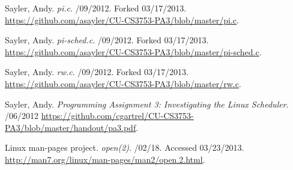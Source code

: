 \begin{thebibliography}{9}      %

 Sayler, Andy.
  \newblock \emph{pi.c}.
  /09/2012.
  \newblock Forked 03/17/2013.
  \newblock \url{https://github.com/asayler/CU-CS3753-PA3/blob/master/pi.c}.

 Sayler, Andy.
  \newblock \emph{pi-sched.c}.
  /09/2012.
  \newblock Forked 03/17/2013.
  \newblock \url{https://github.com/asayler/CU-CS3753-PA3/blob/master/pi-sched.c}.

 Sayler, Andy.
  \newblock \emph{rw.c}.
  /09/2012.
  \newblock Forked 03/17/2013.
  \newblock \url{https://github.com/asayler/CU-CS3753-PA3/blob/master/rw.c}.

 Sayler, Andy.
  \newblock \emph{Programming Assignment 3: Investigating the Linux Scheduler}.
  /06/2012
  \newblock \url{https://github.com/cgartrel/CU-CS3753-PA3/blob/master/handout/pa3.pdf}.

 Linux man-pages project.
  \newblock \emph{open(2)}.
  /02/18.
  \newblock Accessed 03/23/2013.
  \newblock \url{http://man7.org/linux/man-pages/man2/open.2.html}.

\end{thebibliography}
